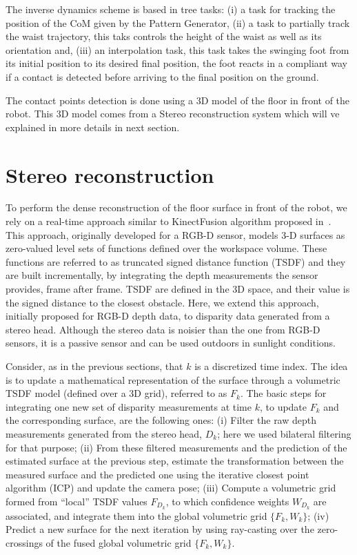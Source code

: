 The inverse dynamics scheme is based in tree tasks: (i) a task for tracking the position of the CoM given by the Pattern Generator, (ii) a task to partially track the waist trajectory, this taks controls the height of the waist as well as its orientation and, (iii) an interpolation task, this task takes the swinging foot from its initial position to its desired final position, the foot reacts in a compliant way if a contact is detected before arriving to the final position on the ground.

The contact points detection is done using a 3D model of the floor in front of the robot. This 3D model comes from a Stereo reconstruction system which will ve explained in more details in next section.

\section{Stereo reconstruction}

To perform the dense reconstruction of the floor surface in front of the robot, we rely on a real-time approach similar to KinectFusion algorithm proposed in~\cite{Newcombe2011}. This approach, originally developed for a RGB-D sensor, models 3-D surfaces as zero-valued level sets of functions defined over the workspace volume. These functions are referred to as truncated signed distance function (TSDF) and they are built incrementally, by integrating the depth measurements the sensor provides, frame after frame. TSDF are defined in the 3D space, and their value is the signed distance to the closest obstacle. Here, we extend this approach, initially proposed for RGB-D depth data, to disparity data generated from a stereo head. Although the stereo data is noisier than the one from RGB-D sensors, it is a passive sensor and can be used outdoors in sunlight conditions.


Consider, as in the previous sections, that $k$ is a discretized time index. The idea is to update a mathematical representation of the surface through a volumetric TSDF model (defined over a 3D grid), referred to as $F_k$. The basic steps for integrating one new set of disparity measurements at time $k$, to update $F_k$ and the corresponding surface, are the following ones: (i) Filter the raw depth measurements generated from the stereo head, $D_k$; here we used bilateral filtering for that purpose; (ii) From these filtered measurements and the prediction of the estimated surface at the previous step, estimate the transformation between the measured surface and the predicted one using the iterative closest point algorithm (ICP) and update the camera pose; (iii) Compute a volumetric grid formed from ``local'' TSDF values $F_{D_k}$, to which confidence weights $W_{D_k}$ are associated, and integrate them into the global volumetric grid $\{F_k,W_k\}$; (iv) Predict a new surface for the next iteration by using ray-casting over the zero-crossings of the fused global volumetric grid $\{F_k,W_k\}$. 


